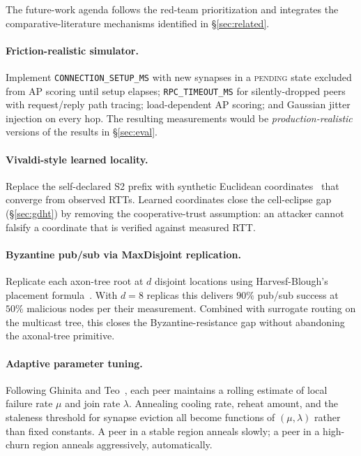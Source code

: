 \documentclass[conference]{IEEEtran}
\begin{document}
The future-work agenda follows the red-team prioritization
\cite{nh1redteam2026} and integrates the comparative-literature
mechanisms identified in \S\ref{sec:related}.

\paragraph{Friction-realistic simulator.} Implement
\texttt{CONNECTION\_SETUP\_MS} with new synapses in a
\textsc{pending} state excluded from AP scoring until setup elapses;
\texttt{RPC\_TIMEOUT\_MS} for silently-dropped peers with
request/reply path tracing; load-dependent AP scoring; and Gaussian
jitter injection on every hop. The resulting measurements would be
\emph{production-realistic} versions of the results in \S\ref{sec:eval}.

\paragraph{Vivaldi-style learned locality.} Replace the self-declared
S2 prefix with synthetic Euclidean coordinates~\cite{dabek2004vivaldi}
that converge from observed RTTs. Learned coordinates close the
cell-eclipse gap (\S\ref{sec:gdht}) by removing the cooperative-trust
assumption: an attacker cannot falsify a coordinate that is verified
against measured RTT.

\paragraph{Byzantine pub/sub via MaxDisjoint replication.} Replicate
each axon-tree root at $d$ disjoint locations using
Harvesf-Blough's placement formula~\cite{harvesf2007design}. With
$d = 8$ replicas this delivers $90\%$ pub/sub success at $50\%$
malicious nodes per their measurement. Combined with surrogate routing
on the multicast tree, this closes the Byzantine-resistance gap without
abandoning the axonal-tree primitive.

\paragraph{Adaptive parameter tuning.} Following Ghinita and
Teo~\cite{ghinita2006adaptive}, each peer maintains a rolling estimate
of local failure rate $\mu$ and join rate $\lambda$. Annealing cooling
rate, reheat amount, and the staleness threshold for synapse eviction
all become functions of $(\mu, \lambda)$ rather than fixed constants.
A peer in a stable region anneals slowly; a peer in a high-churn
region anneals aggressively, automatically.
\end{document}

